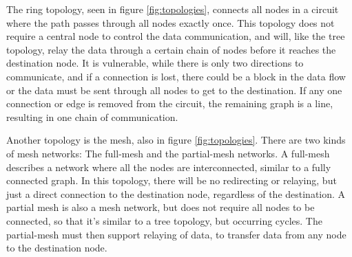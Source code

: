 The ring topology, seen in figure \ref{fig:topologies}, connects all nodes in a circuit where the path passes through all nodes exactly once. This topology does not require a central node to control the data communication, and will, like the tree topology, relay the data through a certain chain of nodes before it reaches the destination node. It is vulnerable, while there is only two directions to communicate, and if a connection is lost, there could be a block in the data flow or the data must be sent through all nodes to get to the destination. If any one connection or edge is removed from the circuit, the remaining graph is a line, resulting in one chain of communication.

Another topology is the mesh, also in figure \ref{fig:topologies}. There are two kinds of mesh networks: The full-mesh and the partial-mesh networks. A full-mesh describes a network where all the nodes are interconnected, similar to a fully connected graph. In this topology, there will be no redirecting or relaying, but just a direct connection to the destination node, regardless of the destination. A partial mesh is also a mesh network, but does not require all nodes to be connected, so that it's similar to a tree topology, but occurring cycles. The partial-mesh must then support relaying of data, to transfer data from any node to the destination node.

